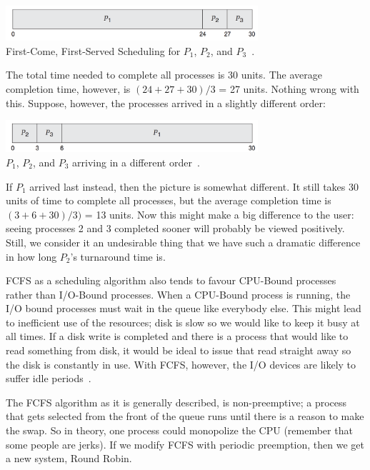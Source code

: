 \begin{center}
	\includegraphics[width=0.7\textwidth]{images/fcfs-1.png}\\
	First-Come, First-Served Scheduling for $P_{1}$, $P_{2}$, and $P_{3}$~\cite{osc}.
\end{center}

The total time needed to complete all processes is 30 units. The average completion time, however, is $(24 + 27 + 30) / 3$ = 27 units. Nothing wrong with this. Suppose, however, the processes arrived in a slightly different order:

\begin{center}
	\includegraphics[width=0.7\textwidth]{images/fcfs-2.png}\\
	$P_{1}$, $P_{2}$, and $P_{3}$ arriving in a different order~\cite{osc}.
\end{center}

If $P_{1}$ arrived last instead, then the picture is somewhat different. It still takes 30 units of time to complete all processes, but the average completion time is $(3 + 6 + 30) / 3)$ = 13 units. Now this might make a big difference to the user: seeing processes 2 and 3 completed sooner will probably be viewed positively. Still, we consider it an undesirable thing that we have such a dramatic difference in how long $P_{2}$'s turnaround time is.

FCFS as a scheduling algorithm also tends to favour CPU-Bound processes rather than I/O-Bound processes. When a CPU-Bound process is running, the I/O bound processes must wait in the queue like everybody else. This might lead to inefficient use of the resources; disk is slow so we would like to keep it busy at all times. If a disk write is completed and there is a process that would like to read something from disk, it would be ideal to issue that read straight away so the disk is constantly in use. With FCFS, however, the I/O devices are likely to suffer idle periods~\cite{osi}.

The FCFS algorithm as it is generally described, is non-preemptive; a process that gets selected from the front of the queue runs until there is a reason to make the swap. So in theory, one process could monopolize the CPU (remember that some people are jerks). If we modify FCFS with periodic preemption, then we get a new system, Round Robin.


